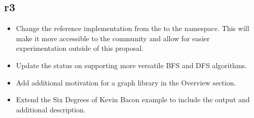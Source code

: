 \subsection*{\paperno r3}
\begin{itemize}
      \item Change the reference implementation from the  to the  namespace. This will
            make it more accessible to the community and allow for easier experimentation outside of this proposal.
      \item Update the status on supporting more versatile BFS and DFS algorithms.
      \item Add additional motivation for a graph library in the Overview section.
      \item Extend the Six Degrees of Kevin Bacon example to include the output and additional description.
\end{itemize}
